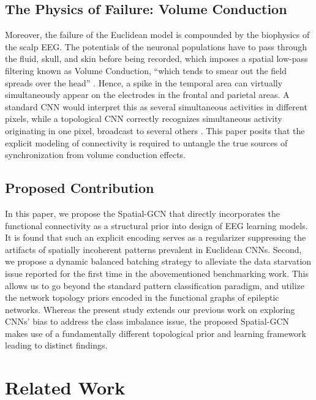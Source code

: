 \documentclass[journal]{IEEEtran}
\begin{document}
\subsection{The Physics of Failure: Volume Conduction}
Moreover, the failure of the Euclidean model is compounded by the biophysics of the scalp EEG. The potentials of the neuronal populations have to pass through the fluid, skull, and skin before being recorded, which imposes a spatial low-pass filtering known as Volume Conduction, ``which tends to smear out the field spreads over the head'' \cite{nunez}. Hence, a spike in the temporal area can virtually simultaneously appear on the electrodes in the frontal and parietal areas. A standard CNN would interpret this as several simultaneous activities in different pixels, while a topological CNN correctly recognizes simultaneous activity originating in one pixel, broadcast to several others \cite{schoffelen}. This paper posits that the explicit modeling of connectivity is required to untangle the true sources of synchronization from volume conduction effects.

\subsection{Proposed Contribution}
In this paper, we propose the Spatial-GCN that directly incorporates the functional connectivity as a structural prior into design of EEG learning models. It is found that such an explicit encoding serves as a regularizer suppressing the artifacts of spatially incoherent patterns prevalent in Euclidean CNNs. Second, we propose a dynamic balanced batching strategy to alleviate the data starvation issue reported for the first time in the abovementioned benchmarking work. This allows us to go beyond the standard pattern classification paradigm, and utilize the network topology priors encoded in the functional graphs of epileptic networks. Whereas the present study extends our previous work on exploring CNNs' bias to address the class imbalance issue, the proposed Spatial-GCN makes use of a fundamentally different topological prior and learning framework leading to distinct findings.

\section{Related Work}
\end{document}
